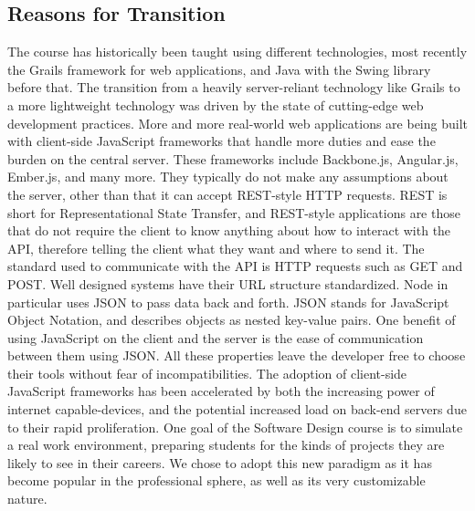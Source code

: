 \documentclass[12pt]{article}
\begin{document}
\subsection{Reasons for Transition}\label{sec:reasons_for_transition}
The course has historically been taught using different technologies, most recently the Grails framework for web applications, and Java with the Swing library before that. The transition from a heavily server-reliant technology like Grails to a more lightweight technology was driven by the state of cutting-edge web development practices. More and more real-world web applications are being built with client-side JavaScript frameworks that handle more duties and ease the burden on the central server. These frameworks include Backbone.js, Angular.js, Ember.js, and many more. They typically do not make any assumptions about the server, other than that it can accept REST-style HTTP requests. REST is short for Representational State Transfer, and REST-style applications are those that do not require the client to know anything about how to interact with the API, therefore telling the client what they want and where to send it. The standard used to communicate with the API is HTTP requests such as GET and POST. Well designed systems have their URL structure standardized. Node in particular uses JSON to pass data back and forth. JSON stands for JavaScript Object Notation, and describes objects as nested key-value pairs. One benefit of using JavaScript on the client and the server is the ease of communication between them using JSON. All these properties leave the developer free to choose their tools without fear of incompatibilities. The adoption of client-side JavaScript frameworks has been accelerated by both the increasing power of internet capable-devices, and the potential increased load on back-end servers due to their rapid proliferation. One goal of the Software Design course is to simulate a real work environment, preparing students for the kinds of projects they are likely to see in their careers. We chose to adopt this new paradigm as it has become popular in the professional sphere, as well as its very customizable nature. 
\end{document}
